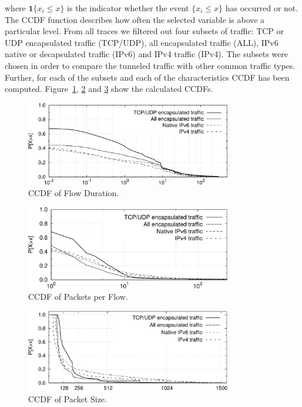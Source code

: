 where $\mathbf{1}\{x_{i}\leq x\}$ is the indicator whether the event $\{x_{i}\leq x\}$ has occurred or not. The CCDF function describes how often the selected variable is above a particular level. From all traces we filtered out four subsets of traffic: TCP or UDP encapsulated traffic (TCP/UDP), all encapsulated traffic (ALL), IPv6 native or decapsulated traffic (IPv6) and IPv4 traffic (IPv4). The subsets were chosen in order to compare the tunneled traffic with other common traffic types. Further, for each of the subsets and each of the characteristics CCDF has been computed. Figure~\ref{fig:ipv6-tunnels-cdf_duration}, \ref{fig:ipv6-tunnels-cdf_packets} and \ref{fig:ipv6-tunnels-cdf_bytes} show the calculated CCDFs.

\begin{figure}[!tb]
     \centering
     \includegraphics[width=0.8\textwidth]{figures/paper-tunnels/cdf_functions/cdf_duration}
     \caption{CCDF of Flow Duration.}
     \label{fig:ipv6-tunnels-cdf_duration}
\end{figure}

\begin{figure}[!tb]
     \centering
     \includegraphics[width=0.8\textwidth]{figures/paper-tunnels/cdf_functions/cdf_packets}
     \caption{CCDF of Packets per Flow.}
     \label{fig:ipv6-tunnels-cdf_packets}
\end{figure}

\begin{figure}[!tb]
     \centering
     \includegraphics[width=0.8\textwidth]{figures/paper-tunnels/cdf_functions/cdf_bytes}
     \caption{CCDF of Packet Size.}
     \label{fig:ipv6-tunnels-cdf_bytes}
\end{figure}

